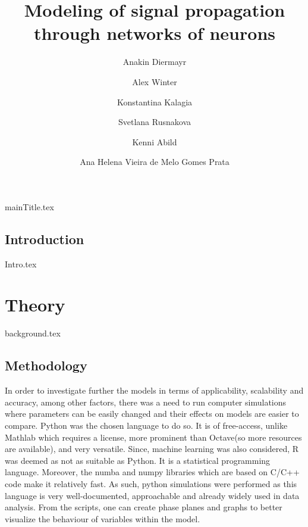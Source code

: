 \documentclass[printGloss]{myRUCProject}
\title{Modeling of signal propagation through networks of neurons}
\author{ Anakin Diermayr \and  Alex Winter \and Konstantina Kalagia \and Svetlana Rusnakova \and Kenni Abild \and  Ana Helena Vieira de Melo Gomes Prata }
\begin{document}

{mainTitle.tex}
\tableofcontents

\printacronyms%










\newpage
{}
\chapter*{Introduction} 
{Intro.tex}

\part{Theory}

{background.tex}

\newpage
\chapter{Methodology}
 In order to investigate further the models in terms of applicability, scalability and accuracy, among other factors, there was a need to run computer simulations where parameters can be easily changed and their effects on models are easier to compare.
 \newline
 Python was the chosen language to do so. It is of free-access, unlike Mathlab which requires a license, more prominent than Octave(so more resources are available), and very versatile. Since, machine learning was also considered, R was deemed as not as suitable as Python. It is a statistical programming language. Moreover, the numba and numpy libraries which are based on C/C++ code make it relatively fast.\newline
 As such, python simulations were performed as this language is very well-documented, approachable and already widely used in data analysis. From the scripts, one can create phase planes and graphs to better visualize the behaviour of variables within the model.
\end{document}
